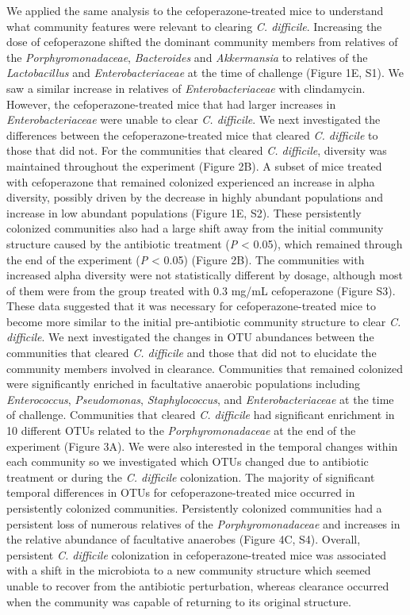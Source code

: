 \documentclass[11pt,]{article}
\begin{document}
We applied the same analysis to the cefoperazone-treated mice to
understand what community features were relevant to clearing \emph{C.
difficile}. Increasing the dose of cefoperazone shifted the dominant
community members from relatives of the \emph{Porphyromonadaceae},
\emph{Bacteroides} and \emph{Akkermansia} to relatives of the
\emph{Lactobacillus} and \emph{Enterobacteriaceae} at the time of
challenge (Figure 1E, S1). We saw a similar increase in relatives of
\emph{Enterobacteriaceae} with clindamycin. However, the
cefoperazone-treated mice that had larger increases in
\emph{Enterobacteriaceae} were unable to clear \emph{C. difficile}. We
next investigated the differences between the cefoperazone-treated mice
that cleared \emph{C. difficile} to those that did not. For the
communities that cleared \emph{C. difficile}, diversity was maintained
throughout the experiment (Figure 2B). A subset of mice treated with
cefoperazone that remained colonized experienced an increase in alpha
diversity, possibly driven by the decrease in highly abundant
populations and increase in low abundant populations (Figure 1E, S2).
These persistently colonized communities also had a large shift away
from the initial community structure caused by the antibiotic treatment
(\emph{P} \textless{} 0.05), which remained through the end of the
experiment (\emph{P} \textless{} 0.05) (Figure 2B). The communities with
increased alpha diversity were not statistically different by dosage,
although most of them were from the group treated with 0.3 mg/mL
cefoperazone (Figure S3). These data suggested that it was necessary for
cefoperazone-treated mice to become more similar to the initial
pre-antibiotic community structure to clear \emph{C. difficile}. We next
investigated the changes in OTU abundances between the communities that
cleared \emph{C. difficile} and those that did not to elucidate the
community members involved in clearance. Communities that remained
colonized were significantly enriched in facultative anaerobic
populations including \emph{Enterococcus}, \emph{Pseudomonas},
\emph{Staphylococcus}, and \emph{Enterobacteriaceae} at the time of
challenge. Communities that cleared \emph{C. difficile} had significant
enrichment in 10 different OTUs related to the \emph{Porphyromonadaceae}
at the end of the experiment (Figure 3A). We were also interested in the
temporal changes within each community so we investigated which OTUs
changed due to antibiotic treatment or during the \emph{C. difficile}
colonization. The majority of significant temporal differences in OTUs
for cefoperazone-treated mice occurred in persistently colonized
communities. Persistently colonized communities had a persistent loss of
numerous relatives of the \emph{Porphyromonadaceae} and increases in the
relative abundance of facultative anaerobes (Figure 4C, S4). Overall,
persistent \emph{C. difficile} colonization in cefoperazone-treated mice
was associated with a shift in the microbiota to a new community
structure which seemed unable to recover from the antibiotic
perturbation, whereas clearance occurred when the community was capable
of returning to its original structure.
\end{document}
